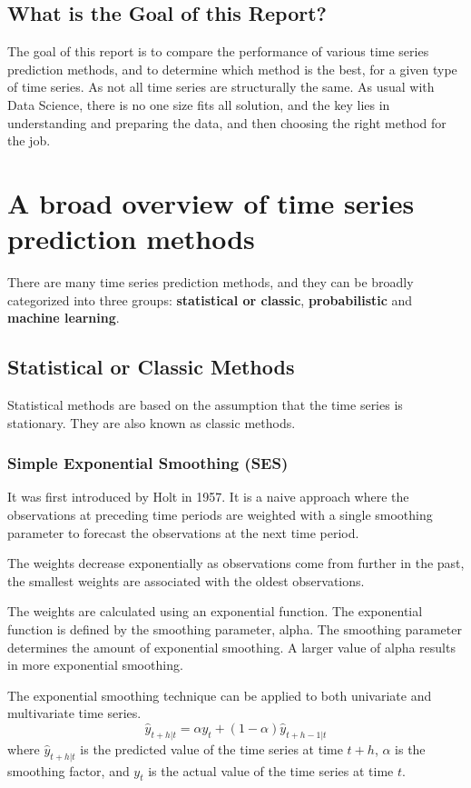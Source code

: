 \documentclass[manuscript,screen,nonacm,11pt]{acmart}
\numberwithin{equation}{section}
\begin{document}
\subsection{What is the Goal of this Report?}
The goal of this report is to compare the performance of various
time series prediction methods, and to determine which method is the best,
for a given type of time series. As not all time series are structurally
the same. As usual with Data Science, there is no one size fits all solution,
and the key lies in understanding and preparing the data, and then
choosing the right method for the job.
\section{A broad overview of time series prediction methods}
\label{sec:overview}
There are many time series prediction methods, and they can be broadly
categorized into three groups: \textbf{statistical or classic}, \textbf{probabilistic} and \textbf{machine learning}.
\subsection{Statistical or Classic Methods}
Statistical methods are based on the assumption that the time series is stationary. They are also known as classic methods.

\subsubsection{Simple Exponential Smoothing (SES)}
It was first introduced by Holt in 1957. It is a naive approach where the observations at
preceding time periods are weighted with a single smoothing parameter to forecast the
observations at the next time period.

The weights decrease exponentially as observations come from further in the past,
the smallest weights are associated with the oldest observations.

The weights are calculated using an exponential function. The exponential function is defined by
the smoothing parameter, alpha. The smoothing parameter determines the amount of exponential
smoothing. A larger value of alpha results in more exponential smoothing.

The exponential smoothing technique can be applied to both univariate and multivariate time series.
\begin{equation}
\label{eq:ses}
\hat{y}_{t+h|t} = \alpha y_t + (1-\alpha)\hat{y}_{t+h-1|t}
\end{equation}
where $\hat{y}_{t+h|t}$ is the predicted value of the time series at time $t+h$,
$\alpha$ is the smoothing factor, and $y_t$ is the actual value of the time series
at time $t$.
\end{document}
